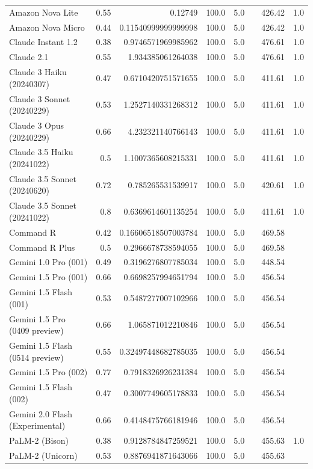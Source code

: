 \begin{table}[htp]
{\begin{tabular}{lrrrrrrr}
Amazon Nova Lite & 0.55 & 0.12749 & 100.0 & 5.0 &  & 426.42 & 1.0 \\
Amazon Nova Micro & 0.44 & 0.11540999999999998 & 100.0 & 5.0 &  & 426.42 & 1.0 \\
Claude Instant 1.2 & 0.38 & 0.9746571969985962 & 100.0 & 5.0 &  & 476.61 & 1.0 \\
Claude 2.1 & 0.55 & 1.934385061264038 & 100.0 & 5.0 &  & 476.61 & 1.0 \\
Claude 3 Haiku (20240307) & 0.47 & 0.6710420751571655 & 100.0 & 5.0 &  & 411.61 & 1.0 \\
Claude 3 Sonnet (20240229) & 0.53 & 1.2527140331268312 & 100.0 & 5.0 &  & 411.61 & 1.0 \\
Claude 3 Opus (20240229) & 0.66 & 4.232321140766143 & 100.0 & 5.0 &  & 411.61 & 1.0 \\
Claude 3.5 Haiku (20241022) & 0.5 & 1.1007365608215331 & 100.0 & 5.0 &  & 411.61 & 1.0 \\
Claude 3.5 Sonnet (20240620) & 0.72 & 0.785265531539917 & 100.0 & 5.0 &  & 420.61 & 1.0 \\
Claude 3.5 Sonnet (20241022) & 0.8 & 0.6369614601135254 & 100.0 & 5.0 &  & 411.61 & 1.0 \\
Command R & 0.42 & 0.16606518507003784 & 100.0 & 5.0 &  & 469.58 &  \\
Command R Plus & 0.5 & 0.2966678738594055 & 100.0 & 5.0 &  & 469.58 &  \\
Gemini 1.0 Pro (001) & 0.49 & 0.3196276807785034 & 100.0 & 5.0 &  & 448.54 &  \\
Gemini 1.5 Pro (001) & 0.66 & 0.6698257994651794 & 100.0 & 5.0 &  & 456.54 &  \\
Gemini 1.5 Flash (001) & 0.53 & 0.5487277007102966 & 100.0 & 5.0 &  & 456.54 &  \\
Gemini 1.5 Pro (0409 preview) & 0.66 & 1.065871012210846 & 100.0 & 5.0 &  & 456.54 &  \\
Gemini 1.5 Flash (0514 preview) & 0.55 & 0.32497448682785035 & 100.0 & 5.0 &  & 456.54 &  \\
Gemini 1.5 Pro (002) & 0.77 & 0.7918326926231384 & 100.0 & 5.0 &  & 456.54 &  \\
Gemini 1.5 Flash (002) & 0.47 & 0.3007749605178833 & 100.0 & 5.0 &  & 456.54 &  \\
Gemini 2.0 Flash (Experimental) & 0.66 & 0.4148475766181946 & 100.0 & 5.0 &  & 456.54 &  \\
PaLM-2 (Bison) & 0.38 & 0.9128784847259521 & 100.0 & 5.0 &  & 455.63 & 1.0 \\
PaLM-2 (Unicorn) & 0.53 & 0.8876941871643066 & 100.0 & 5.0 &  & 455.63 &  \\

\end{tabular}}
\end{table}
